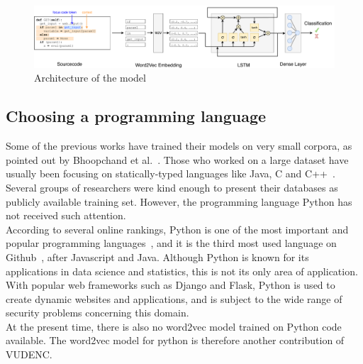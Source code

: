 \documentclass[
a4paper,
pagesize,
pdftex,
12pt,
twoside, %
BCOR=5mm, %
ngerman,
fleqn,
final,
]{scrartcl}
\begin{document}
	\begin{figure}[ht]
		\centering
		\includegraphics[width=\linewidth]{img/Architecture}
		\caption{Architecture of the model}
		\label{fig:architecture}
	\end{figure}
	
	
	\subsection{Choosing a programming language}
	Some of the previous works have trained their models on very small corpora, as pointed out by Bhoopchand et al.~\cite{Bhoopchand.2016}. Those who worked on a large dataset have usually been focusing on statically-typed languages like Java, C and C++~\cite{Bellon.2007,Russell.2018,Liu.2018,Dam.2017, Rolim.2018}. Several groups of researchers were kind enough to present their databases as publicly available training set. However, the programming language Python has not received such attention. \\
	According to several online rankings, Python is one of the most important and popular programming languages~\cite{AyeshaCuthbert.15.4.2019, VidushiDwivedi.}, and it is the third most used language on Github~\cite{Github.com.19}, after Javascript and Java. Although Python is known for its applications in data science and statistics, this is not its only area of application. With popular web frameworks such as Django and Flask, Python is used to create dynamic websites and applications, and is subject to the wide range of security problems concerning this domain.\\
	At the present time, there is also no word2vec model trained on Python code available. The word2vec model for python is therefore  another contribution of VUDENC.\\
	
\end{document}
